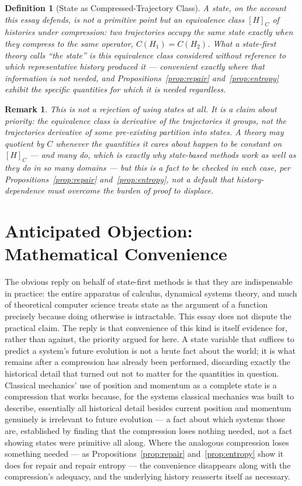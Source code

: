 \documentclass[11pt]{article}
\newtheorem{definition}{Definition}[section]
\newtheorem*{remark}{Remark}
\begin{document}
\begin{definition}[State as Compressed-Trajectory Class]
A state, on the account this essay defends, is not a primitive point but an equivalence class $[H]_C$ of histories under compression: two trajectories occupy the same state exactly when they compress to the same operator, $C(H_1)=C(H_2)$. What a state-first theory calls ``the state'' is this equivalence class considered without reference to which representative history produced it — convenient exactly where that information is not needed, and Propositions~\ref{prop:repair} and~\ref{prop:entropy} exhibit the specific quantities for which it is needed regardless.
\end{definition}

\begin{remark}
This is not a rejection of using states at all. It is a claim about priority: the equivalence class is derivative of the trajectories it groups, not the trajectories derivative of some pre-existing partition into states. A theory may quotient by $C$ whenever the quantities it cares about happen to be constant on $[H]_C$ — and many do, which is exactly why state-based methods work as well as they do in so many domains — but this is a fact to be checked in each case, per Propositions~\ref{prop:repair} and~\ref{prop:entropy}, not a default that history-dependence must overcome the burden of proof to displace.
\end{remark}

\section{Anticipated Objection: Mathematical Convenience}

The obvious reply on behalf of state-first methods is that they are indispensable in practice: the entire apparatus of calculus, dynamical systems theory, and much of theoretical computer science treats state as the argument of a function precisely because doing otherwise is intractable. This essay does not dispute the practical claim. The reply is that convenience of this kind is itself evidence for, rather than against, the priority argued for here. A state variable that suffices to predict a system's future evolution is not a brute fact about the world; it is what remains after a compression has already been performed, discarding exactly the historical detail that turned out not to matter for the quantities in question. Classical mechanics' use of position and momentum as a complete state is a compression that works because, for the systems classical mechanics was built to describe, essentially all historical detail besides current position and momentum genuinely is irrelevant to future evolution — a fact about which systems those are, established by finding that the compression loses nothing needed, not a fact showing states were primitive all along. Where the analogous compression loses something needed — as Propositions~\ref{prop:repair} and~\ref{prop:entropy} show it does for repair and repair entropy — the convenience disappears along with the compression's adequacy, and the underlying history reasserts itself as necessary.
\end{document}
